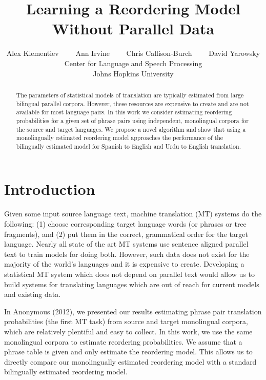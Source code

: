 \documentclass[11pt,letterpaper]{article}
\title{Learning a Reordering Model Without Parallel Data}
\author{Alex Klementiev \ \ \ \  Ann Irvine \ \ \ \ Chris Callison-Burch \ \ \ \ David Yarowsky \\
 Center for Language and Speech Processing \\ Johns Hopkins University}
\date{}
\begin{document}
\maketitle

\begin{abstract}
The parameters of statistical models of translation are typically estimated from large bilingual parallel corpora.  However, these resources are expensive to create and are not available for most language pairs.  In this work we consider estimating reordering probabilities for a given set of phrase pairs using independent, monolingual corpora for the source and target languages. We propose a novel algorithm and show that using a monolingually estimated reordering model approaches the performance of the bilingually estimated model for Spanish to English and Urdu to English translation.
\end{abstract}

\section{Introduction}

Given some input source language text, machine translation (MT) systems do the following: (1) choose corresponding target language words (or phrases or tree fragments), and (2) put them in the correct, grammatical order for the target language. Nearly all state of the art MT systems use sentence aligned parallel text to train models for doing both. However, such data does not exist for the majority of the world's languages and it is expensive to create. Developing a statistical MT system which does not depend on parallel text would allow us to build systems for translating languages which are out of reach for current models and existing data. 

In Anonymous (2012), we presented our results estimating phrase pair translation probabilities (the first MT task) from source and target monolingual corpora, which are relatively plentiful and easy to collect. In this work, we use the same monolingual corpora to estimate reordering probabilities. We assume that a phrase table is given and only estimate the reordering model. This allows us to directly compare our monolingually estimated reordering model with a standard bilingually estimated reordering model.

\end{document}
